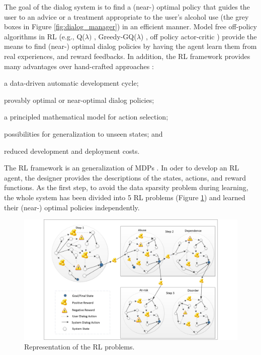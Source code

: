 \documentclass[letterpaper]{article}
\begin{document}
The goal of the dialog system is to find a (near-) optimal policy that guides the user to an advice 
or a treatment appropriate to the user's alcohol use (the grey boxes in Figure \ref{fig:dialog_manager}) in an efficient manner. 
Model free off-policy algorithms in RL (e.g., Q($\lambda)$ \cite{sutton1998reinforcement}, 
Greedy-GQ($\lambda$) \cite{maei2010toward}, off policy actor-critic \cite{DegrisWS12}) provide the 
means to find (near-) optimal dialog policies by having the agent learn them 
from real experiences, and reward feedbacks. In addition, the RL framework provides many advantages over hand-crafted approaches \cite{lemon2007machine}: \begin{inparaenum}[1)] \item a 
data-driven automatic development cycle; \item provably optimal or near-optimal dialog policies; 
\item  a principled mathematical model for action selection; \item  possibilities for generalization 
to unseen states; and \item reduced development and deployment costs.\end{inparaenum} 

The RL framework is an generalization of MDPs \cite{sutton1998reinforcement}. In oder to develop an RL 
agent, the designer provides the descriptions of the states, actions, and reward functions. As the 
first step, to avoid the data sparsity problem during learning, the whole system has been 
divided into 5 RL problems (Figure \ref{fig:5mdpv2}) and learned their 
(near-) optimal policies independently. 

\begin{figure}[!t]
  \centering    
	\includegraphics[width=1.0\textwidth]{figures/5MDPV2}
	\caption{Representation of the RL problems.}
  \label{fig:5mdpv2}
\end{figure}
\end{document}
